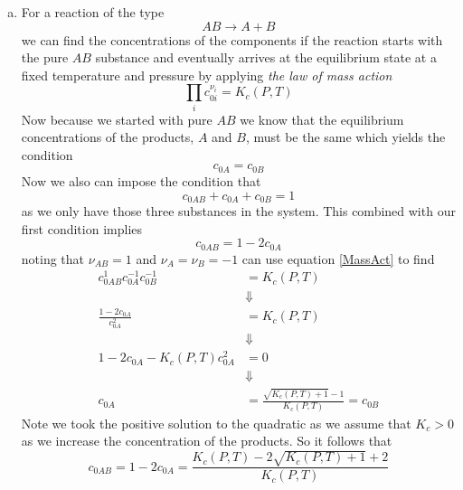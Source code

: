 \documentclass[11pt]{article}
\numberwithin{equation}{section}
\begin{document}
\begin{enumerate}[(a)]
\item For a reaction of the type
$$AB \rightarrow A + B$$
we can find the concentrations of the components if the reaction starts with the pure $AB$ 
substance and eventually arrives at the equilibrium state at a fixed temperature and pressure
by applying \emph{the law of mass action}
\begin{equation}
\prod_{i}c_{0i}^{\nu_{i}} = K_c(P,T)
\label{MassAct}
\end{equation}
Now because we started with pure $AB$ we know that the equilibrium concentrations of the 
products, $A$ and $B$, must be the same which yields the condition
$$c_{0A} = c_{0B}$$
Now we also can impose the condition that
$$c_{0AB}+c_{0A}+c_{0B} =1$$
as we only have those three substances in the system. This combined with our first condition
implies
$$c_{0AB} = 1 - 2c_{0A}$$
noting that $\nu_{AB}=1$ and $\nu_{A}=\nu_{B}=-1$ can use equation \ref{MassAct} to find
\begin{align*}
c_{0AB}^{1}c_{0A}^{-1}c_{0B}^{-1} &= K_c(P,T)\\
&\Downarrow\\
\frac{1-2c_{0A}}{c_{0A}^2} &= K_c(P,T)\\
&\Downarrow\\
1-2c_{0A}-K_c(P,T){c_{0A}^2} &= 0\\
&\Downarrow\\
c_{0A} &= \frac{\sqrt{K_c(P,T)+1}-1}{K_c(P,T)} = c_{0B}
\end{align*}
Note we took the positive solution to the quadratic as we assume that $K_c>0$ as we increase
the concentration of the products. So it follows that 
$$c_{0AB} = 1-2c_{0A} =  \frac{K_{c}(P,T) - 2\sqrt{K_c(P,T)+1}+2}{K_c(P,T)}$$
\end{enumerate}

\pagebreak
\end{document}
